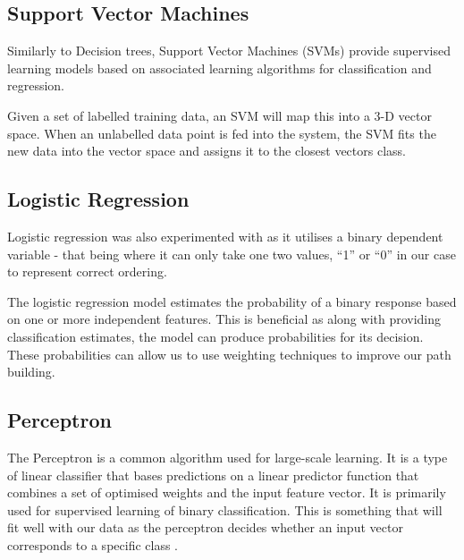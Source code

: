 \documentclass[bsc,frontabs,twoside,singlespacing,parskip,deptreport]{infthesis}     %
\begin{document}

\subsection{Support Vector Machines}
Similarly to Decision trees, Support Vector Machines (SVMs) provide supervised learning models based on
associated learning algorithms for classification and regression.

Given a set of labelled training data, an SVM will map this into a 3-D vector space.
When an unlabelled data point is fed into the system, the SVM fits the new data into the vector space and
assigns  it to the closest vectors class.

\subsection{Logistic Regression}
Logistic regression was also experimented with as it utilises a binary dependent variable - that being where it
can only take one two values, ``1'' or ``0'' in our case to represent correct ordering.


The logistic regression model estimates the probability of a binary response based on one or more independent features.
This is beneficial as along with providing classification estimates, the model can produce probabilities for its
decision. These probabilities can allow us to use weighting techniques to improve our path building.

\subsection{Perceptron}
The Perceptron is a common algorithm used for large-scale learning.
It is a type of linear classifier that bases predictions on a linear predictor function that combines a set of optimised weights
and the input feature vector.
It is primarily used for supervised learning of binary classification.
This is something that will fit well with our data as the perceptron decides whether an input vector
corresponds to a specific class \cite{freund1999large}.
\end{document}
